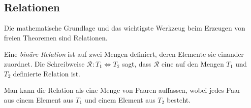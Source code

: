 






\subsection{Relationen}


Die mathematische Grundlage und das wichtigste Werkzeug beim Erzeugen von freien Theoremen sind Relationen.


\begin{mydef}
Eine \textit{binäre Relation} ist auf zwei Mengen definiert, deren Elemente sie einander zuordnet. Die Schreibweise
$\mathcal{R} : T_1 \Leftrightarrow T_2$ sagt, dass $\mathcal{R}$ eine auf den Mengen $T_1$ und $T_2$ definierte
Relation ist.
\end{mydef}

Man kann die Relation als eine Menge von Paaren auffassen, wobei jedes Paar aus einem Element aus $T_1$ und einem
Element aus $T_2$ besteht.

